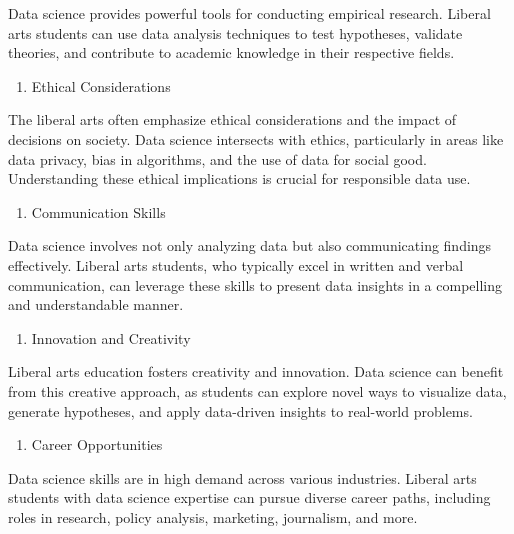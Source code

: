\documentclass[
  letterpaper,
  DIV=11,
  numbers=noendperiod]{scrreprt}
\providecommand{\tightlist}{%
  \setlength{\itemsep}{0pt}\setlength{\parskip}{0pt}}\usepackage{longtable,booktabs,array}
\begin{document}
Data science provides powerful tools for conducting empirical research.
Liberal arts students can use data analysis techniques to test
hypotheses, validate theories, and contribute to academic knowledge in
their respective fields.

\begin{enumerate}
\def\labelenumi{\arabic{enumi}.}
\setcounter{enumi}{4}
\tightlist
\item
  Ethical Considerations
\end{enumerate}

The liberal arts often emphasize ethical considerations and the impact
of decisions on society. Data science intersects with ethics,
particularly in areas like data privacy, bias in algorithms, and the use
of data for social good. Understanding these ethical implications is
crucial for responsible data use.

\begin{enumerate}
\def\labelenumi{\arabic{enumi}.}
\setcounter{enumi}{5}
\tightlist
\item
  Communication Skills
\end{enumerate}

Data science involves not only analyzing data but also communicating
findings effectively. Liberal arts students, who typically excel in
written and verbal communication, can leverage these skills to present
data insights in a compelling and understandable manner.

\begin{enumerate}
\def\labelenumi{\arabic{enumi}.}
\setcounter{enumi}{6}
\tightlist
\item
  Innovation and Creativity
\end{enumerate}

Liberal arts education fosters creativity and innovation. Data science
can benefit from this creative approach, as students can explore novel
ways to visualize data, generate hypotheses, and apply data-driven
insights to real-world problems.

\begin{enumerate}
\def\labelenumi{\arabic{enumi}.}
\setcounter{enumi}{7}
\tightlist
\item
  Career Opportunities
\end{enumerate}

Data science skills are in high demand across various industries.
Liberal arts students with data science expertise can pursue diverse
career paths, including roles in research, policy analysis, marketing,
journalism, and more.
\end{document}
